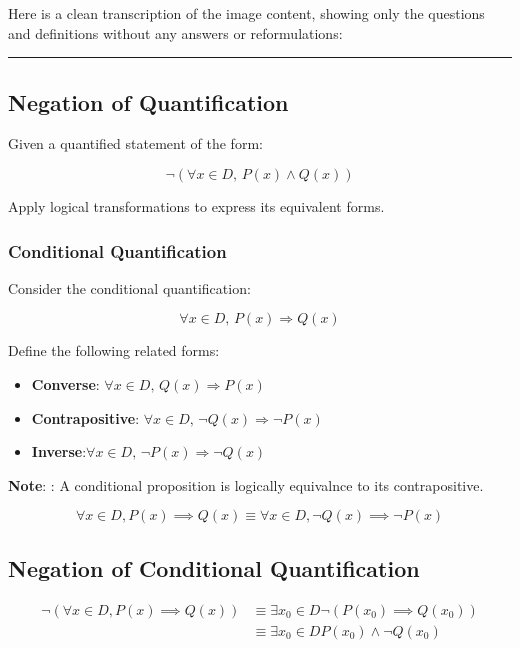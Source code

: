 \documentclass[
]{book}
\theoremstyle{definition}
\theoremstyle{definition}
\theoremstyle{definition}
\theoremstyle{definition}
\theoremstyle{remark}
\begin{document}
Here is a clean transcription of the image content, showing only the questions and definitions without any answers or reformulations:

\begin{center}\rule{0.5\linewidth}{0.5pt}\end{center}

\subsection{Negation of Quantification}\label{negation-of-quantification}

Given a quantified statement of the form:

\[
\neg(\forall x \in D,\, P(x) \land Q(x))
\]

Apply logical transformations to express its equivalent forms.

\subsubsection{Conditional Quantification}\label{conditional-quantification}

Consider the conditional quantification:

\[
\forall x \in D,\, P(x) \Rightarrow Q(x)
\]

Define the following related forms:

\begin{itemize}
\item
  \textbf{Converse}: \(\forall x \in D,\, Q(x) \Rightarrow P(x)\)
\item
  \textbf{Contrapositive}: \(\forall x \in D,\, \neg Q(x) \Rightarrow \neg P(x)\)
\item
  \textbf{Inverse}:\(\forall x \in D,\, \neg P(x) \Rightarrow \neg Q(x)\)
\end{itemize}

\textbf{Note}: : A conditional proposition is logically equivalnce to its contrapositive.

\[
\forall x \in D, P(x) \implies Q(x)\equiv \forall x\in D, \neg Q(x) \implies \neg P(x)
\]

\subsection{Negation of Conditional Quantification}\label{negation-of-conditional-quantification}

\begin{align}
\neg (\forall x \in D, P(x) \implies Q(x)) &\equiv \exists x_0 \in D \neg (P(x_0) \implies Q(x_0))\\
& \equiv \exists x_0 \in D P(x_0) \land  \neg Q(x_0)
\end{align}
\end{document}
